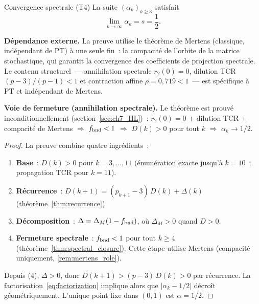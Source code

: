 \documentclass[12pt,a4paper]{article}
\begin{document}
\begin{thmbox}{Convergence spectrale (T4)}
\label{thm:T4}
La suite $(\alpha_k)_{k \geq 3}$ satisfait
\begin{equation}
  \lim_{k \to \infty} \alpha_k = s = \frac{1}{2}.
  \label{eq:T4}
\end{equation}

\textbf{Dépendance externe.}
La preuve utilise le théorème de Mertens (classique, indépendant de
PT) à une seule fin~: la compacité de l'orbite de la matrice
stochastique, qui garantit la convergence des coefficients de
projection spectrale. Le contenu structurel~--- annihilation
spectrale $r_2(0) = 0$, dilution TCR $(p{-}3)/(p{-}1) < 1$ et
contraction affine $\rho = 0{,}719 < 1$~--- est spécifique à PT et
indépendant de Mertens.

\textbf{Voie de fermeture (annihilation spectrale).}
Le théorème est prouvé inconditionnellement (section~\ref{sec:ch7_HL})~:
$r_2(0) = 0$ + dilution TCR + compacité de Mertens $\Rightarrow$
$f_{\rm bnd} < 1$ $\Rightarrow$ $D(k) > 0$ pour tout $k$
$\Rightarrow$ $\alpha_k \to 1/2$.

\begin{proof}
La preuve combine quatre ingrédients~:
\begin{enumerate}[nosep]
\item \textbf{Base}~: $D(k) > 0$ pour $k = 3,\ldots,11$ (énumération
  exacte jusqu'à $k = 10$~; propagation TCR pour $k = 11$).
\item \textbf{Récurrence}~: $D(k+1) = (p_{k+1}-3)\,D(k) + \Delta(k)$
  (théorème~\ref{thm:recurrence}).
\item \textbf{Décomposition}~: $\Delta = \Delta_M(1 - f_{\rm bnd})$,
  où $\Delta_M > 0$ quand $D > 0$.
\item \textbf{Fermeture spectrale}~: $f_{\rm bnd} < 1$ pour tout
  $k \geq 4$ (théorème~\ref{thm:spectral_closure}). Cette étape
  utilise Mertens (compacité uniquement,
  \cref{rem:mertens_role}).
\end{enumerate}
Depuis (4), $\Delta > 0$, donc $D(k+1) > (p-3)\,D(k) > 0$ par
récurrence. La factorisation~\eqref{eq:factorization} implique alors
que $|\alpha_k - 1/2|$ décroît géométriquement. L'unique point fixe
dans $(0,1)$ est $\alpha = 1/2$.
\end{proof}
\end{thmbox}
\end{document}
